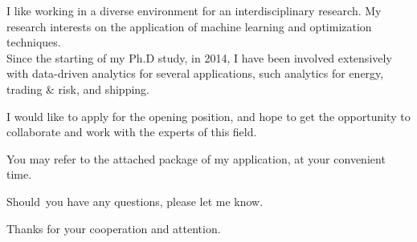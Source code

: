 \documentclass[11pt,letterpaper,sans]{moderncv}   %
\begin{document}

I like working in a diverse environment for an interdisciplinary research. My research interests on the application of machine learning and optimization techniques.\\


Since the starting of my Ph.D study, in 2014, I have been involved extensively with data-driven analytics for several applications, such analytics for energy, trading \& risk, and shipping.

I would like to apply for the opening position, and hope to get the opportunity to collaborate and work with the experts of this field.





You may refer to the attached package of my application, at your convenient time.

Should you have any questions, please let me know.


Thanks for your cooperation and attention.

\makeletterclosing


\clearpage
\end{document}
